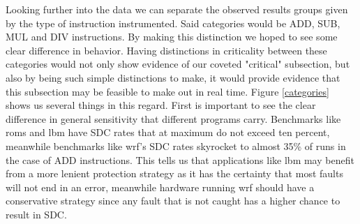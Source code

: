 \documentclass[lettersize,journal]{IEEEtran}
\begin{document}
Looking further into the data we can separate the observed results groups given by the type of instruction instrumented. Said categories would be ADD, SUB, MUL and DIV instructions. By making this distinction we hoped to see some clear difference in behavior. Having distinctions in criticality between these categories would not only show evidence of our coveted "critical" subsection, but also by being such simple distinctions to make, it would provide evidence that this subsection may be feasible to make out in real time. Figure \ref{categories} shows us several things in this regard. First is important to see the clear difference in general sensitivity that different programs carry. Benchmarks like roms and lbm have SDC rates that at maximum do not exceed ten percent, meanwhile benchmarks like wrf's SDC rates skyrocket to almost 35\% of runs in the case of ADD instructions. This tells us that applications like lbm may benefit from a more lenient protection strategy as it has the certainty that most faults will not end in an error, meanwhile hardware running wrf should have a conservative strategy since any fault that is not caught has a higher chance to result in SDC.\\
\end{document}

